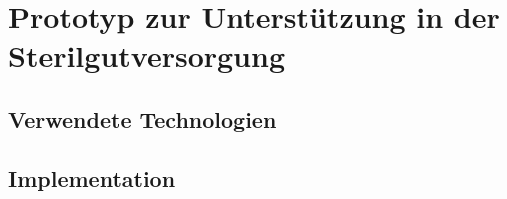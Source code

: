 \chapter{Prototyp zur Unterstützung in der Sterilgutversorgung}
\section{Verwendete Technologien}
\section{Implementation}